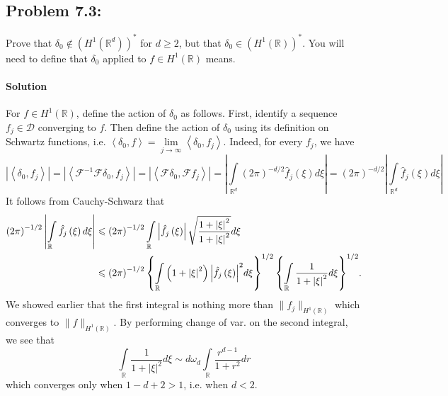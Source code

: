\documentclass[letterpaper,twoside,11pt]{article}
\theoremstyle{mystyle}
\newcommand{\R}{{\mathbb R}}
\begin{document}
\newpage 
\subsection*{Problem 7.3:}
Prove that $\delta_0 \notin \left( H^1\left( \R^d \right) \right)^*$ for $d \geq 2$, but that $\delta_0 \in \left( H^1\left( \R \right) \right)^*$. You will need to define that $\delta_0$ applied to $f \in H^1\left( \R \right)$ means. 
\paragraph*{Solution} 

For $f \in H^1\left( \R \right)$, define the action of $\delta_0$ as follows. First, identify a sequence $f_j \in \mathcal D$ converging to $f$. Then define the action of $\delta_0$ using its definition on Schwartz functions, i.e. $\left\langle {{\delta _0},f} \right\rangle  = \mathop {\lim }\limits_{j \to \infty } \left\langle {{\delta _0},{f_j}} \right\rangle $. Indeed, for every $f_j$, we have 
\[\left| {\left\langle {{\delta _0},{f_j}} \right\rangle } \right| = \left| {\left\langle {{\mathcal{F}^{ - 1}}\mathcal{F}{\delta _0},{f_j}} \right\rangle } \right| = \left| {\left\langle {\mathcal{F}{\delta _0},\mathcal{F}{f_j}} \right\rangle } \right| = \left| {\int\limits_{{\mathbb{R}^d}} {{{\left( {2\pi } \right)}^{ - d/2}}{{\hat f}_j}\left( \xi  \right)d\xi } } \right| = {\left( {2\pi } \right)^{ - d/2}}\left| {\int\limits_{{\mathbb{R}^d}} {{{\hat f}_j}\left( \xi  \right)d\xi } } \right|\]
It follows from Cauchy-Schwarz that 
\begin{align*}
  {\left( {2\pi } \right)^{ - 1/2}}\left| {\int\limits_{{\mathbb{R}}} {{{\hat f}_j}\left( \xi  \right)d\xi } } \right| &\leqslant {\left( {2\pi } \right)^{ - 1/2}}\int\limits_{{\mathbb{R}}} {\left| {{{\hat f}_j}\left( \xi  \right)} \right|\sqrt {\frac{{1 + {{\left| \xi  \right|}^2}}}{{1 + {{\left| \xi  \right|}^2}}}} d\xi }  \hfill \\
   &\leqslant {\left( {2\pi } \right)^{ - 1/2}}\left\{ {\int\limits_{{\mathbb{R}}} {\left( {1 + {{\left| \xi  \right|}^2}} \right){{\left| {{{\hat f}_j}\left( \xi  \right)} \right|}^2}d\xi } } \right\}^{1/2}{\left\{ {\int\limits_{{\mathbb{R}}} {\frac{1}{{1 + {{\left| \xi  \right|}^2}}}d\xi } } \right\}^{1/2}} .
\end{align*}
We showed earlier that the first integral is nothing more than $\|f_j\|_{H^1\left( \R \right)}$ which converges to $\|f\|_{H^1\left( \R \right)}$. By performing change of var. on the second integral, we see that 
\[\int\limits_\mathbb{R} {\frac{1}{{1 + {{\left| \xi  \right|}^2}}}d\xi } \sim d{\omega _d}\int\limits_\mathbb{R} {\frac{{{r^{d - 1}}}}{{1 + {r^2}}}dr} \]
which converges only when $1 - d + 2 > 1$, i.e. when $d <2$. 
\end{document}
